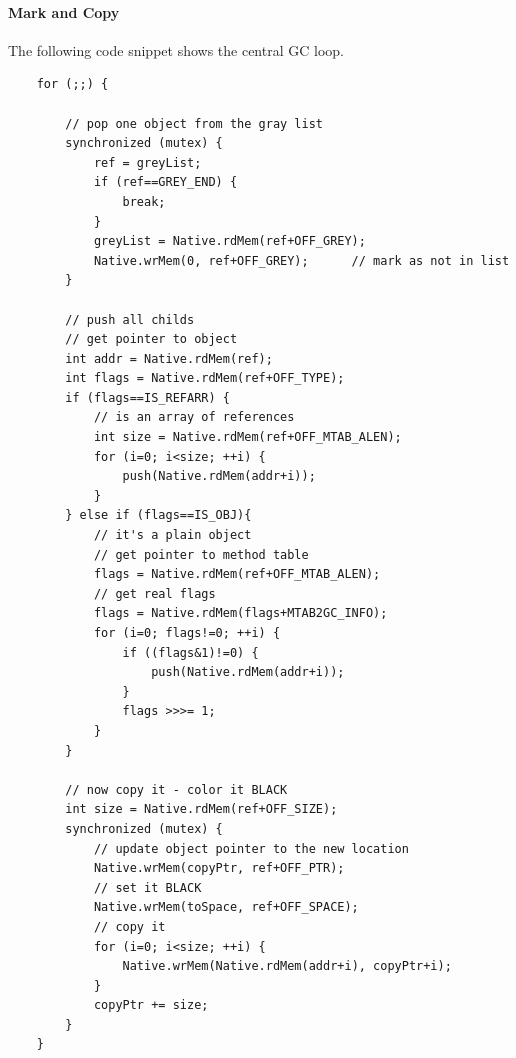 \paragraph{Mark and Copy} The following code snippet shows the
central GC loop.
%
{\small
\begin{verbatim}
    for (;;) {

        // pop one object from the gray list
        synchronized (mutex) {
            ref = greyList;
            if (ref==GREY_END) {
                break;
            }
            greyList = Native.rdMem(ref+OFF_GREY);
            Native.wrMem(0, ref+OFF_GREY);      // mark as not in list
        }

        // push all childs
        // get pointer to object
        int addr = Native.rdMem(ref);
        int flags = Native.rdMem(ref+OFF_TYPE);
        if (flags==IS_REFARR) {
            // is an array of references
            int size = Native.rdMem(ref+OFF_MTAB_ALEN);
            for (i=0; i<size; ++i) {
                push(Native.rdMem(addr+i));
            }
        } else if (flags==IS_OBJ){
            // it's a plain object
            // get pointer to method table
            flags = Native.rdMem(ref+OFF_MTAB_ALEN);
            // get real flags
            flags = Native.rdMem(flags+MTAB2GC_INFO);
            for (i=0; flags!=0; ++i) {
                if ((flags&1)!=0) {
                    push(Native.rdMem(addr+i));
                }
                flags >>>= 1;
            }
        }

        // now copy it - color it BLACK
        int size = Native.rdMem(ref+OFF_SIZE);
        synchronized (mutex) {
            // update object pointer to the new location
            Native.wrMem(copyPtr, ref+OFF_PTR);
            // set it BLACK
            Native.wrMem(toSpace, ref+OFF_SPACE);
            // copy it
            for (i=0; i<size; ++i) {
                Native.wrMem(Native.rdMem(addr+i), copyPtr+i);
            }
            copyPtr += size;
        }
    }
\end{verbatim}
}

